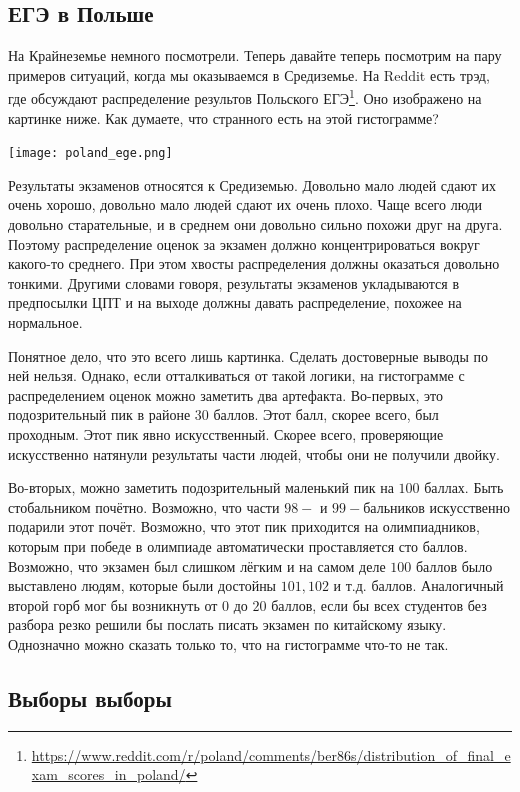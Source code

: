 \documentclass[12pt, a4paper, oneside]{article}
\begin{document}
\subsection{ЕГЭ в Польше}

На Крайнеземье немного посмотрели. Теперь давайте теперь посмотрим на пару примеров ситуаций, когда мы оказываемся в Средиземье. На Reddit есть трэд, где обсуждают распределение результов Польского ЕГЭ\footnote{\url{https://www.reddit.com/r/poland/comments/ber86s/distribution_of_final_exam_scores_in_poland/}}. Оно изображено на картинке ниже. Как думаете, что странного есть на этой гистограмме?

\begin{center} 
\texttt{[image: poland\_ege.png]}
\end{center} 

Результаты экзаменов относятся к Средиземью. Довольно мало людей сдают их очень хорошо, довольно мало людей сдают их очень плохо. Чаще всего люди довольно старательные, и в среднем они довольно сильно похожи друг на друга. Поэтому распределение оценок за экзамен должно концентрироваться вокруг какого-то среднего. При этом хвосты распределения должны оказаться довольно тонкими. Другими словами говоря, результаты экзаменов укладываются в предпосылки ЦПТ и на выходе должны давать распределение, похожее на нормальное.

Понятное дело, что это всего лишь картинка. Сделать достоверные выводы по ней нельзя. Однако, если отталкиваться от такой логики, на гистограмме с распределением оценок можно заметить два артефакта. Во-первых, это подозрительный пик в районе $30$ баллов. Этот балл, скорее всего, был проходным. Этот пик явно искусственный. Скорее всего, проверяющие искусственно натянули результаты части людей, чтобы они не получили двойку. 

Во-вторых, можно заметить подозрительный маленький пик на $100$ баллах. Быть стобальником почётно. Возможно, что части $98-$ и $99-$бальников искусственно подарили этот почёт. Возможно, что этот пик приходится на олимпиадников, которым при победе в олимпиаде автоматически проставляется сто баллов. Возможно, что экзамен был слишком лёгким и на самом деле $100$ баллов было выставлено людям, которые были достойны $101, 102$ и т.д. баллов. Аналогичный второй горб мог бы возникнуть от $0$ до $20$ баллов, если бы всех студентов без разбора резко решили бы послать писать экзамен по китайскому языку. Однозначно можно сказать только то, что на гистограмме что-то не так. 

\subsection{Выборы выборы}
\end{document}
